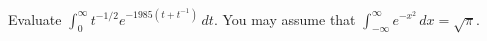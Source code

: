 Evaluate $\int_0^\infty t^{-1/2}e^{-1985(t+t^{-1})}\,dt$. You may
assume that $\int_{-\infty}^\infty e^{-x^2}\,dx = \sqrt{\pi}$.
